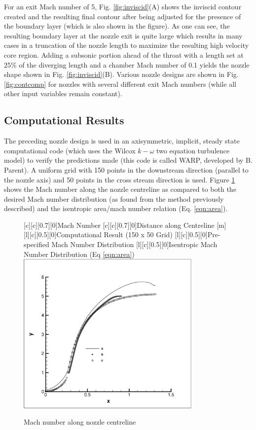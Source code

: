 	For an exit Mach number of 5, Fig. \ref{fig:inviscid}(A) shows the inviscid contour
created and the resulting final contour after being adjusted for the presence of the boundary layer
(which is also shown in the figure).  As one can see, the resulting boundary layer at the 
nozzle exit is quite large which results in many cases in a truncation of the nozzle length to 
maximize the resulting high velocity core region.  Adding a subsonic portion ahead of the throat with a 
length set at 25\% of the diverging length and a chamber Mach number of 0.1 yields the nozzle shape 
shown in Fig. \ref{fig:inviscid}(B).  Various nozzle designs are shown in Fig. \ref{fig:contcomp} for 
nozzles with several different exit Mach numbers (while all other input variables remain constant). 

\subsection{Computational Results}

	The preceding nozzle design is used in an axisymmetric, implicit, steady state computational code 
(which uses the Wilcox $k-\omega$ two equation turbulence model) to verify the predictions made (this
code is called WARP, developed by B. Parent).  
A uniform grid with 150 points in the downstream direction (parallel to the nozzle axis) and 50 points
in the cross stream direction is used.  Figure \ref{fig:warpcent} shows the Mach number along the nozzle 
centreline as compared to both the desired Mach number distribution (as found from the method previously
described) and the isentropic area/mach number relation (Eq. \ref{eqn:area}).

\begin{figure}[!h]
\begin{center}
[c][c][0.7][0]{Mach Number}
[c][c][0.7][0]{Distance along Centreline [m]}
[l][c][0.5][0]{Computational Result (150 x 50 Grid)}
[l][c][0.5][0]{Pre-specified Mach Number Distribution}
[l][c][0.5][0]{Isentropic Mach Number Distribution (Eq \ref{eqn:area})}
\includegraphics[width=9cm]{warpcentcomp.eps}
\caption{Mach number along nozzle centreline}
\label{fig:warpcent}
\end{center}
\end{figure}  

